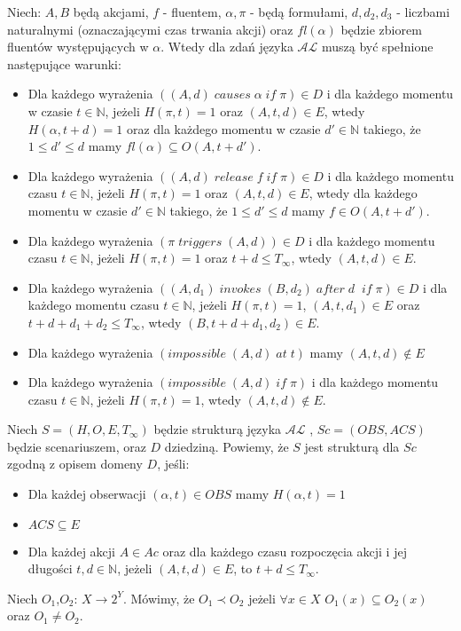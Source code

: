 Niech: $A,B$ będą akcjami, $ f $ - fluentem, $\alpha, \pi$ - będą formułami, $d,d_{2},d_{3} $ - liczbami naturalnymi (oznaczającymi czas trwania akcji) oraz $fl(\alpha)$ będzie zbiorem fluentów występujących w $\alpha$. Wtedy dla zdań języka $\mathcal{AL}$  muszą być spełnione następujące warunki: 
   \begin{itemize} 
   		\item Dla każdego wyrażenia $ ( (A,d)\;causes\;\alpha\;if\;\pi)\in D $ i dla każdego momentu w czasie $t \in \mathbb{N}$, jeżeli $H(\pi,t)=1$ oraz $(A,t,d) \in E$, wtedy $H(\alpha,t+d)=1$ oraz dla każdego momentu w czasie $ d' \in \mathbb{N}$ takiego, że $1\leq d'\leq d$ mamy $fl(\alpha)\subseteq O(A,t+d')$.
   		\item Dla każdego wyrażenia $( (A,d) \;release\;f\;if\;\pi)\in D $ i dla każdego momentu czasu $t \in \mathbb{N}$, jeżeli $H(\pi,t)=1$ oraz $(A,t,d)\in E$, wtedy dla każdego momentu w czasie $ d' \in \mathbb{N}$ takiego, że $1\leq d'\leq d$ mamy $f\in O(A,t+d')$.
   		\item Dla każdego wyrażenia $(\pi\;triggers\; (A,d))\in D$ i dla każdego momentu czasu $t \in \mathbb{N}$, jeżeli $H(\pi,t)=1$ oraz $t+d\leq T_{\infty}$, wtedy $(A,t,d)\in E$.
		\item Dla każdego wyrażenia $( (A,d_{1})\;invokes\;(B,d_{2})\;after\;d\;\;if\;\pi)\in D$ i dla każdego momentu czasu $t \in \mathbb{N}$, jeżeli $H(\pi,t)=1$, $(A,t,d_{1})\in E $ oraz $t+d+d_{1}+d_{2}\leq T_{\infty}$, wtedy $(B,t+d+d_{1},d_{2}) \in E $.
		\item Dla każdego wyrażenia $(impossible \; (A, d) \; at\;  t )$ mamy $(A,t,d) \notin E $
		\item Dla każdego wyrażenia $(impossible \; (A, d) \; if\;  \pi )$ i dla każdego momentu czasu $t \in \mathbb{N}$, jeżeli $H(\pi,t)=1$, wtedy $(A,t,d) \notin E $.
   \end{itemize}
   \begin{definition}
   Niech $S = (H,O,E,T_{\infty})$ będzie strukturą języka $\mathcal{AL}$ , $ Sc=(OBS,ACS) $ będzie scenariuszem, oraz $ D $ dziedziną. Powiemy, że $ S $ jest strukturą dla $Sc$ zgodną z opisem domeny $D$, jeśli:
   		\begin{itemize} 
     		\item Dla każdej obserwacji $(\alpha,t )\in OBS$ mamy $H(\alpha,t )=1$
     		\item $ACS \subseteq E$ 
     		\item Dla każdej akcji $ {A \in Ac}$ oraz dla każdego czasu rozpoczęcia akcji i jej długości $t,d \in \mathbb{N}$, jeżeli $(A,t,d) \in E $, to $t+d \leq T_{\infty}$. 
    		\end{itemize} 
   \end{definition}
   \begin{definition}
   Niech $O_{1}$,$O_{2}$: $X \longrightarrow 2^{Y}$. Mówimy, że $O_{1} \prec O_{2}$ jeżeli $\forall x\in X$ $O_{1}(x)\subseteq O_{2}(x)$ oraz $O_{1}\neq O_{2}$.
   \end{definition}
   
